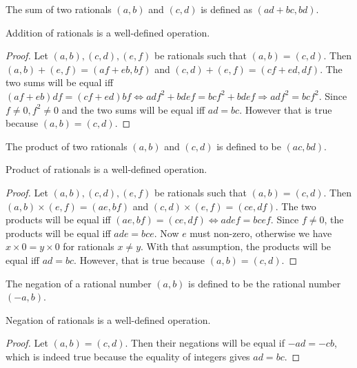 \begin{defn}\label{c3s2d2}
The sum of two rationals $(a, b)$ and $(c, d)$ is defined as
$(ad + bc, bd)$.
\end{defn}

\begin{lem}\label{c3s2l2}
Addition of rationals is a well-defined operation.
\end{lem}
\begin{proof}
Let $(a, b), (c, d), (e, f)$ be rationals such that $(a, b) = (c, d)$.
Then $(a, b) + (e, f) = (af + eb, bf)$ and $(c, d) + (e, f) = (cf+ed, df)$.
The two sums will be equal iff $(af + eb)df = (cf + ed)bf \Leftrightarrow
adf^2 + bdef = bcf^2 + bdef \Rightarrow adf^2 = bcf^2$. Since $f \ne 0,
f^2 \ne 0$ and the two sums will be equal iff $ad = bc$. However that is 
true because $(a, b) = (c, d)$.
\end{proof}

\begin{defn}\label{c3s2d3}
The product of two rationals $(a, b)$ and $(c, d)$ is defined to be $(ac,
bd)$.
\end{defn}

\begin{lem}\label{c3s2l3}
Product of rationals is a well-defined operation.
\end{lem}
\begin{proof}
Let $(a, b), (c, d), (e, f)$ be rationals such that $(a, b) = (c, d)$.
Then $(a, b) \times (e, f) = (ae, bf)$ and $(c, d) \times (e, f)=(ce, df)$.
The two products will be equal iff $(ae, bf) = (ce, df) \Leftrightarrow
adef = bcef$. Since $f \ne 0$, the products will be equal iff $ade = bce$.
Now $e$ must non-zero, otherwise we have $x\times 0 = y\times 0$ for 
rationals $x \ne y$. With that assumption, the products will be equal iff
$ad = bc$. However, that is true because $(a, b) = (c, d)$.
\end{proof}

\begin{defn}\label{c3s2d4}
The negation of a rational number $(a, b)$ is defined to be the rational
number $(-a, b)$.
\end{defn}

\begin{lem}\label{c3s2l4}
Negation of rationals is a well-defined operation.
\end{lem}
\begin{proof}
Let $(a, b) = (c, d)$. Then their negations will be equal if $-ad = -cb$,
which is indeed true because the equality of integers gives $ad = bc$.
\end{proof}

